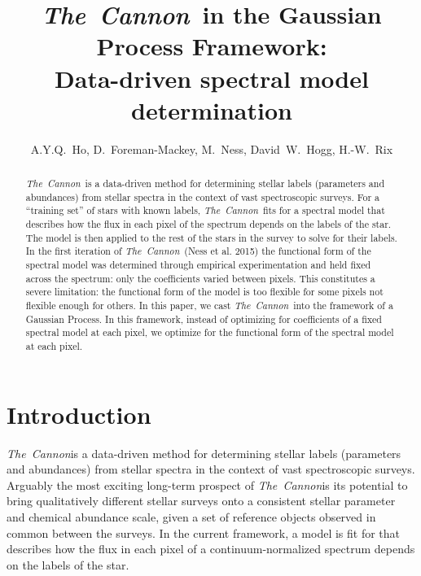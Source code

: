 \documentclass[12pt, preprint]{aastex}
\newcommand{\tc}{\textsl{The~Cannon}}
\begin{document}
\title{\tc\ in the Gaussian Process Framework: \\ Data-driven spectral
model determination}
\author{A.Y.Q.~Ho,
D.~Foreman-Mackey,
M.~Ness,
David~W.~Hogg, 
H.-W.~Rix
}


\begin{abstract}

\tc\ is a data-driven method for determining stellar labels (parameters and 
abundances) from stellar spectra in the context of vast spectroscopic surveys. 
For a ``training set'' of stars with known labels, \tc\ fits for a spectral 
model that describes how the flux in each pixel of the spectrum depends on the 
labels of the star. The model is then applied to the rest of the stars in the 
survey to solve for their labels. 
In the first iteration of \tc\ (Ness et al. 2015) the functional form of the 
spectral model was determined through empirical experimentation and held fixed
across the spectrum: only the coefficients varied between pixels. 
This constitutes a severe limitation: the functional form of the model is too 
flexible for some pixels 
not flexible enough for others. In this paper, we cast \tc\ into the framework
of a Gaussian Process. In this framework, instead of optimizing for 
coefficients of a fixed spectral model at each pixel, we optimize for the
functional form of the spectral model at each pixel. 

\end{abstract}


\section{Introduction}

\tc is a data-driven method for determining stellar labels (parameters and 
abundances) from stellar
spectra in the context of vast spectroscopic surveys. Arguably the most
exciting long-term prospect of \tc is its potential to bring qualitatively
different stellar surveys onto a consistent stellar parameter and chemical
abundance scale, given a set of reference objects observed in common between
the surveys. In the current framework, a model is fit for that describes
how the flux in each pixel of a continuum-normalized spectrum depends
on the labels of the star.
\end{document}
